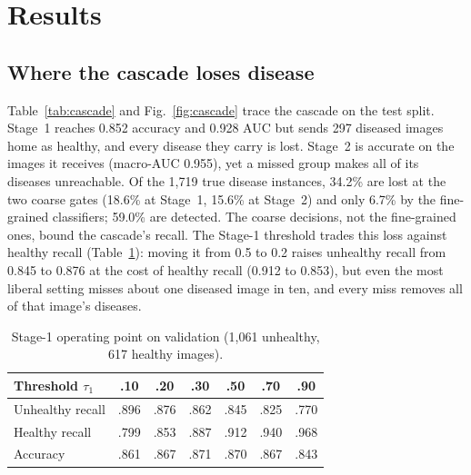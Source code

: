 \documentclass[conference]{IEEEtran}
\begin{document}
\section{Results}
\subsection{Where the cascade loses disease}\label{sec:loss}
Table~\ref{tab:cascade} and Fig.~\ref{fig:cascade} trace the cascade on the test
split. Stage~1 reaches 0.852 accuracy and 0.928 AUC but sends 297 diseased images
home as healthy, and every disease they carry is lost. Stage~2 is accurate on the
images it receives (macro-AUC 0.955), yet a missed group makes all of its diseases
unreachable. Of the 1{,}719 true disease instances, 34.2\% are lost at the two coarse
gates (18.6\% at Stage~1, 15.6\% at Stage~2) and only 6.7\% by the fine-grained
classifiers; 59.0\% are detected. The coarse decisions, not the fine-grained
ones, bound the cascade's recall. The Stage-1 threshold trades this loss against healthy recall
(Table~\ref{tab:s1}): moving it from 0.5 to 0.2 raises unhealthy recall from 0.845
to 0.876 at the cost of healthy recall (0.912 to 0.853), but even the most liberal
setting misses about one diseased image in ten, and every miss removes all of that
image's diseases.
\begin{table}[t]
\centering
\caption{Stage-1 operating point on validation (1{,}061 unhealthy, 617 healthy
images).}
\label{tab:s1}
\setlength{\tabcolsep}{6pt}
\footnotesize
\begin{tabular}{@{}lcccccc@{}}
\toprule
Threshold $\tau_1$ & .10 & .20 & .30 & .50 & .70 & .90\\
\midrule
Unhealthy recall & .896 & .876 & .862 & .845 & .825 & .770\\
Healthy recall & .799 & .853 & .887 & .912 & .940 & .968\\
Accuracy & .861 & .867 & .871 & .870 & .867 & .843\\
\bottomrule
\end{tabular}
\end{table}
\end{document}
